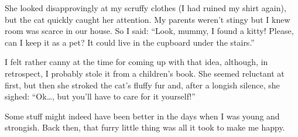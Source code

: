 She looked disapprovingly at my scruffy clothes (I had ruined my shirt again), but the cat quickly caught her attention. My parents weren't stingy but I knew room was scarce in our house. So I said: ``Look, mummy, I found a kitty! Please, can I keep it as a pet? It could live in the cupboard under the stairs.''

I felt rather canny at the time for coming up with that idea, although, in retrospect, I probably stole it from a children's book. She seemed reluctant at first, but then she stroked the cat's fluffy fur and, after a longish silence, she sighed: ``Ok\dots, but you'll have to care for it yourself!''

Some stuff might indeed have been better in the days when I was young and strongish. Back then, that furry little thing was all it took to make me happy.